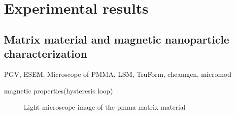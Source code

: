 \section{Experimental results}
\label{sec:exp_res}

\subsection{Matrix material and magnetic nanoparticle characterization}
\label{subsec:mat_mag_char_res}
PGV, ESEM, Microscope of PMMA, LSM, TruForm, cheamgen, micromod

magnetic properties(hysteresis loop)

\begin{figure}[h]
\centering

\caption[Light microscope image of \gls{pmma}]{Light microscope image of the \gls{pmma} matrix material
\label{fig:waveform}
}
\end{figure}


